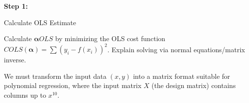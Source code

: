 \leavevmode{}%
\textbf{Step 1:}

Calculate OLS Estimate

Calculate \(\boldsymbol{\alpha}{OLS}\) by minimizing the OLS cost
function \(C{OLS}(\boldsymbol{\alpha}) = \sum (y_i - f(x_i))^2\).
Explain solving via normal equations/matrix inverse.

\leavevmode{}%
We must transform the input data \((x, y)\) into a matrix format
suitable for polynomial regression, where the input matrix \(X\) (the
design matrix) contains columns up to \(x^{10}\).

\hypertarget{5729c1e8}{}
\begin{Shaded}
\begin{Highlighting}[]
\OperatorTok{=}\NormalTok{ np.array([}\OperatorTok{{-}}\NormalTok{, }\NormalTok{, }\NormalTok{, }\OperatorTok{{-}}\NormalTok{, }\OperatorTok{{-}}\NormalTok{, }\NormalTok{, }\OperatorTok{{-}}\NormalTok{, }\NormalTok{, }\NormalTok{, }\NormalTok{, }\OperatorTok{{-}}\NormalTok{, }\NormalTok{, }\NormalTok{, }\NormalTok{, }\OperatorTok{{-}}\NormalTok{, }\OperatorTok{{-}}\NormalTok{, }\OperatorTok{{-}}\NormalTok{, }\NormalTok{, }\NormalTok{, }\OperatorTok{{-}}\NormalTok{, }\OperatorTok{{-}}\NormalTok{, }\NormalTok{])}
\OperatorTok{=}\NormalTok{ np.array([}\OperatorTok{{-}}\NormalTok{, }\NormalTok{, }\NormalTok{, }\OperatorTok{{-}}\NormalTok{, }\OperatorTok{{-}}\NormalTok{, }\NormalTok{, }\OperatorTok{{-}}\NormalTok{, }\NormalTok{, }\NormalTok{, }\NormalTok{, }\NormalTok{, }\NormalTok{, }\OperatorTok{{-}}\NormalTok{, }\NormalTok{, }\NormalTok{, }\NormalTok{, }\OperatorTok{{-}}\NormalTok{, }\NormalTok{, }\NormalTok{, }\NormalTok{, }\OperatorTok{{-}}\NormalTok{, }\NormalTok{])}


\end{Highlighting}
\end{Shaded}

